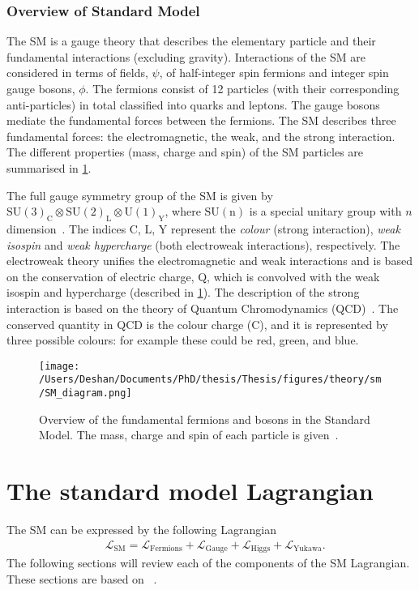 \subsubsection{Overview of Standard Model}\label{sec:SM:intro}
The SM is a gauge theory that describes the elementary particle and their fundamental interactions (excluding gravity). Interactions of the SM are considered in terms of fields, $\psi$, of half-integer spin fermions and integer spin gauge bosons, $\phi$. The fermions consist of 12 particles (with their corresponding anti-particles) in total classified into quarks and leptons. The gauge bosons mediate the fundamental forces between the fermions. The SM describes three fundamental forces: the electromagnetic, the weak, and the strong interaction. The different properties (mass, charge and spin) of the SM particles are summarised in \cref{fig:sm_diagram}. 

The full gauge symmetry group of the SM is given by $\mathrm{SU(3)}_\mathrm{C} \otimes \mathrm{SU(2)}_\mathrm{L} \otimes \mathrm{U(1)}_\mathrm{Y}$, where $\mathrm{SU(n)}$ is a special unitary group with $n$ dimension~\cite{stephanhaywood}. The indices C, L, Y represent the \emph{colour} (strong interaction), \emph{weak isospin} and \emph{weak hypercharge} (both electroweak interactions), respectively. The electroweak theory unifies the electromagnetic and weak interactions and is based on the conservation of electric charge, Q, which is convolved with the weak isospin and hypercharge (described in \cref{sec:SM:lagrangian}). The description of the strong interaction is based on the theory of Quantum Chromodynamics (QCD)~\cite{Zweig:1964jf}. The conserved quantity in QCD is the colour charge (C), and it is represented by three possible colours: for example these could be red, green, and blue. 

\begin{figure}[!htpb]
    \centering
    \texttt{[image: /Users/Deshan/Documents/PhD/thesis/Thesis/figures/theory/sm/SM\_diagram.png]}
    \caption{Overview of the fundamental fermions and bosons in the Standard Model. The mass, charge and spin of each particle is given~\cite{wiki:xxx}.}
    \label{fig:sm_diagram}
\end{figure}

\section{The standard model Lagrangian}\label{sec:SM:lagrangian}
The SM can be expressed by the following Lagrangian
\begin{equation}
    \label{eq:lagrangianSM}
    \begin{aligned}
        & \mathcal{L}_\mathrm{SM} = \mathcal{L}_\mathrm{Fermions} + \mathcal{L}_\mathrm{Gauge} + \mathcal{L}_\mathrm{Higgs} + \mathcal{L}_\mathrm{Yukawa}.
    \end{aligned}
\end{equation}
The following sections will review each of the components of the SM Lagrangian. These sections are based on ~\cite{Thomson:2013zua,Peskin:1995ev}.

